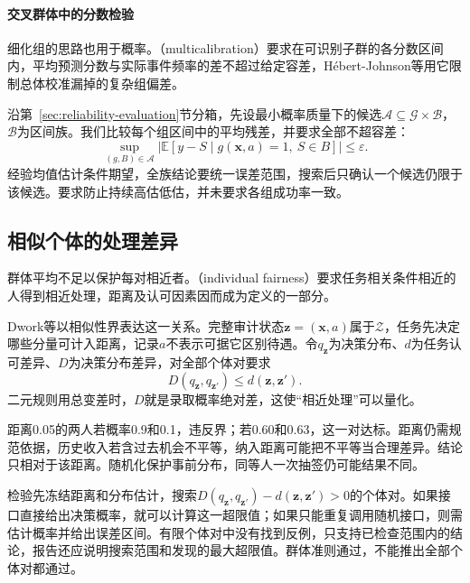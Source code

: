 \paragraph{交叉群体中的分数检验}

细化组的思路也用于概率。（multicalibration）要求在可识别子群的各分数区间内，平均预测分数与实际事件频率的差不超过给定容差，Hébert-Johnson等用它限制总体校准漏掉的复杂组偏差。

沿第~\ref{sec:reliability-evaluation}节分箱，先设最小概率质量下的候选$\mathcal A\subseteq\mathcal G\times\mathcal B$，$\mathcal B$为区间族。我们比较每个组区间中的平均残差，并要求全部不超容差：
\begin{equation}
 \sup_{(g,B)\in\mathcal A}
 \left|\mathbb E[y-S\mid
       g(\bm{x},a)=1,\ S\in B]\right|
 \leq\varepsilon.
 \label{eq:fairness-multicalibration}
\end{equation}
经验均值估计条件期望，全族结论要统一误差范围，搜索后只确认一个候选仍限于该候选。要求防止持续高估低估，并未要求各组成功率一致。

\subsection{相似个体的处理差异}
\label{sec:fairness-individual-comparison}

群体平均不足以保护每对相近者。（individual fairness）要求任务相关条件相近的人得到相近处理，距离及认可因素因而成为定义的一部分。

Dwork等以相似性界表达这一关系。完整审计状态$\bm z=(\bm x,a)$属于$\mathcal Z$，任务先决定哪些分量可计入距离，记录$a$不表示可据它区别待遇。令$q_{\bm z}$为决策分布、$d$为任务认可差异、$D$为决策分布差异，对全部个体对要求
\begin{equation}
 D(q_{\bm z},q_{\bm z'})\leq d(\bm z,\bm z').
 \label{eq:fairness-individual}
\end{equation}
二元规则用总变差时，$D$就是录取概率绝对差，这使“相近处理”可以量化。

距离0.05的两人若概率0.9和0.1，违反界；若0.60和0.63，这一对达标。距离仍需规范依据，历史收入若含过去机会不平等，纳入距离可能把不平等当合理差异。结论只相对于该距离。随机化保护事前分布，同等人一次抽签仍可能结果不同。

检验先冻结距离和分布估计，搜索$D(q_{\bm z},q_{\bm z'})-d(\bm z,\bm z')>0$的个体对。如果接口直接给出决策概率，就可以计算这一超限值；如果只能重复调用随机接口，则需估计概率并给出误差区间。有限个体对中没有找到反例，只支持已检查范围内的结论，报告还应说明搜索范围和发现的最大超限值。群体准则通过，不能推出全部个体对都通过。

